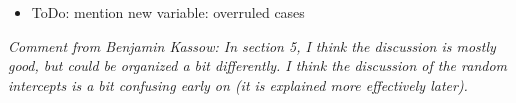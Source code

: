 \documentclass[headsepline=true, abstracton]{scrartcl}
\begin{document}
\begin{itemize}
\item ToDo: mention new variable: overruled cases
\end{itemize}


\textit{Comment from Benjamin Kassow: In section 5, I think the discussion is mostly good, but could be organized a bit differently. 
I think the discussion of the random intercepts is a bit confusing early on (it is explained more effectively later). }




\end{document}
